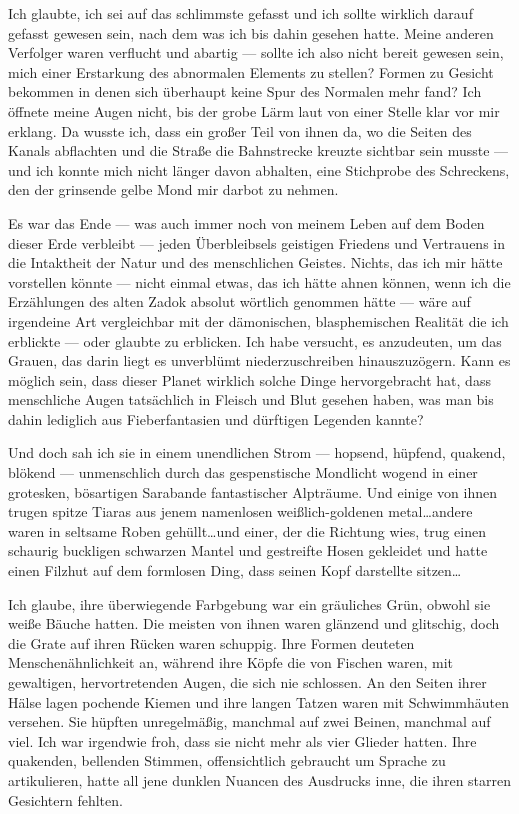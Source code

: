 Ich glaubte, ich sei auf das schlimmste gefasst und ich sollte wirklich darauf gefasst gewesen sein, nach dem was ich bis dahin gesehen hatte. Meine anderen Verfolger waren verflucht und abartig --- sollte ich also nicht bereit gewesen sein, mich einer Erstarkung des abnormalen Elements zu stellen? Formen zu Gesicht bekommen in denen sich überhaupt keine Spur des Normalen mehr fand? Ich öffnete meine Augen nicht, bis der grobe Lärm laut von einer Stelle klar vor mir erklang. Da wusste ich, dass ein großer Teil von ihnen da, wo die Seiten des Kanals abflachten und die Straße die Bahnstrecke kreuzte sichtbar sein musste --- und ich konnte mich nicht länger davon abhalten, eine Stichprobe des Schreckens, den der grinsende gelbe Mond mir darbot zu nehmen.

Es war das Ende --- was auch immer noch von meinem Leben auf dem Boden dieser Erde verbleibt --- jeden Überbleibsels geistigen Friedens und Vertrauens in die Intaktheit der Natur und des menschlichen Geistes. Nichts, das ich mir hätte vorstellen könnte --- nicht einmal etwas, das ich hätte ahnen können, wenn ich die Erzählungen des alten Zadok absolut wörtlich genommen hätte --- wäre auf irgendeine Art vergleichbar mit der dämonischen, blasphemischen Realität die ich erblickte --- oder glaubte zu erblicken. Ich habe versucht, es anzudeuten, um das Grauen, das darin liegt es unverblümt niederzuschreiben hinauszuzögern. Kann es möglich sein, dass dieser Planet wirklich solche Dinge hervorgebracht hat, dass menschliche Augen tatsächlich in Fleisch und Blut gesehen haben, was man bis dahin lediglich aus Fieberfantasien und dürftigen Legenden kannte?

Und doch sah ich sie in einem unendlichen Strom --- hopsend, hüpfend, quakend, blökend --- unmenschlich durch das gespenstische Mondlicht wogend in einer grotesken, bösartigen Sarabande fantastischer Alpträume. Und einige von ihnen trugen spitze Tiaras aus jenem namenlosen weißlich-goldenen metal\dots  andere waren in seltsame Roben gehüllt\dots  und einer, der die Richtung wies, trug einen schaurig buckligen schwarzen Mantel und gestreifte Hosen gekleidet und hatte einen Filzhut auf dem formlosen Ding, dass seinen Kopf darstellte sitzen\dots

Ich glaube, ihre überwiegende Farbgebung war ein gräuliches Grün, obwohl sie weiße Bäuche hatten. Die meisten von ihnen waren glänzend und glitschig, doch die Grate auf ihren Rücken waren schuppig. Ihre Formen deuteten Menschenähnlichkeit an, während ihre Köpfe die von Fischen waren, mit gewaltigen, hervortretenden Augen, die sich nie schlossen. An den Seiten ihrer Hälse lagen pochende Kiemen und ihre langen Tatzen waren mit Schwimmhäuten versehen. Sie hüpften unregelmäßig, manchmal auf zwei Beinen, manchmal auf viel. Ich war irgendwie froh, dass sie nicht mehr als vier Glieder hatten. Ihre quakenden, bellenden Stimmen, offensichtlich gebraucht um Sprache zu artikulieren, hatte all jene dunklen Nuancen des Ausdrucks inne, die ihren starren Gesichtern fehlten.

